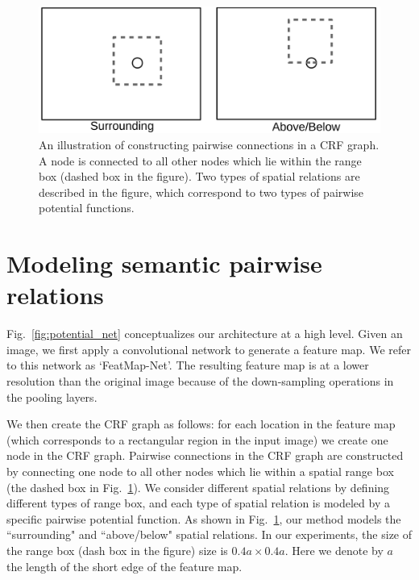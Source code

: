 



%
%
%
%
%
%





\begin{figure}[t]
	\center
	\includegraphics[width=.8\linewidth]{./figs/pairwise_conn}
\caption{An illustration of constructing pairwise connections in a CRF graph.
A node is connected to all other nodes which lie within the range box (dashed box in the figure).
Two types of spatial relations are described in the figure, which
correspond to two types of pairwise potential functions.
}
\label{fig:pairwise}
\end{figure}











\section{Modeling semantic pairwise relations}

Fig.~\ref{fig:potential_net} conceptualizes our architecture at a high level.
%
Given an image, we first apply a convolutional network to generate a feature map.
We refer to this network as `FeatMap-Net'.
The resulting feature map is at a lower resolution than the original image because of the down-sampling operations in the pooling layers.
%

We then create the CRF graph as follows:
for each location in the feature map (which corresponds to a rectangular region in the input image) we create one node in the CRF graph.
%
%
Pairwise connections in the CRF graph are constructed by connecting one node to all other nodes 
which lie within a spatial range box (the dashed box in Fig.~\ref{fig:pairwise}).
We consider different spatial relations by defining different types of range box, and each type of spatial relation is modeled by a specific pairwise potential function.
As shown in Fig.~\ref{fig:pairwise},  our method models the ``surrounding" and ``above/below" spatial relations.
%
%
In our experiments, the size of the range box (dash box in the figure) size is $0.4a \times 0.4a$.
Here we denote by $a$ the length of the short edge of the feature map.


